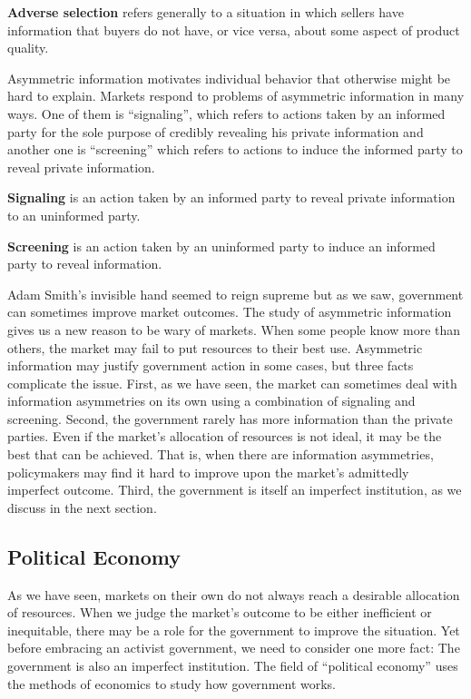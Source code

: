 \textbf{Adverse selection} refers generally to a situation in which sellers have information that buyers do not have, or
vice versa, about some aspect of product quality.
\ed

Asymmetric information motivates individual behavior that otherwise might be hard to explain. Markets respond to
problems of asymmetric information in many ways. One of them is ``signaling'', which refers to actions taken by an
informed party for the sole purpose of credibly revealing his private information and another one is ``screening''
which refers to actions to induce the informed party to reveal private information.

\bd[Signaling]
\textbf{Signaling} is an action taken by an informed party to reveal private information to an uninformed party.
\ed

\bd[Screening]
\textbf{Screening} is an action taken by an uninformed party to induce an informed party to reveal information.
\ed

Adam Smith's invisible hand seemed to reign supreme but as we saw, government can sometimes improve market outcomes.
The study of asymmetric information gives us a new reason to be wary of markets. When some people know more than
others, the market may fail to put resources to their best use. Asymmetric information may justify government action
in some cases, but three facts complicate the issue. First, as we have seen, the market can sometimes deal with
information asymmetries on its own using a combination of signaling and screening. Second, the government rarely has
more information than the private parties. Even if the market's allocation of resources is not ideal, it may be the
best that can be achieved. That is, when there are information asymmetries, policymakers may find it hard to improve
upon the market's admittedly imperfect outcome. Third, the government is itself an imperfect institution, as we
discuss in the next section.

\subsection{Political Economy}

As we have seen, markets on their own do not always reach a desirable allocation of resources. When we judge the
market's outcome to be either inefficient or inequitable, there may be a role for the government to improve the
situation. Yet before embracing an activist government, we need to consider one more fact: The government is also an
imperfect institution. The field of ``political economy'' uses the methods of economics to study how government works.

